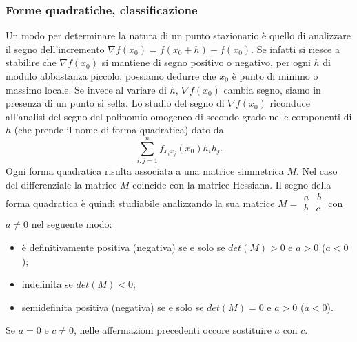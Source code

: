 \subsubsection*{Forme quadratiche, classificazione}
Un modo per determinare la natura di un punto stazionario è quello di analizzare il segno dell'incremento $\nabla f(x_0) = f(x_0 + h ) - f(x_0)$. Se infatti si riesce a stabilire che $\nabla f(x_0)$ si mantiene di segno positivo o negativo, per ogni $h$ di modulo abbastanza piccolo, possiamo dedurre che $x_0$ è punto di minimo o massimo locale. Se invece al variare di $h$, $\nabla f(x_0)$ cambia segno, siamo in presenza di un punto si sella.\newline
Lo studio del segno di $\nabla f(x_0)$ riconduce all'analisi del segno del polinomio omogeneo di secondo grado nelle componenti di $h$ (che prende il nome di forma quadratica) dato da
\[
    \sum_{i,j=1}^{n}f_{x_ix_j}(x_0)h_ih_j.
\]
Ogni forma quadratica risulta associata a una matrice simmetrica $M$. Nel caso del differenziale la matrice $M$ coincide con la matrice Hessiana.\newline
Il segno della forma quadratica è quindi studiabile analizzando la sua matrice $M = \begin{matrix}
    a \;\;\; b\\
    b \;\;\; c\\
\end{matrix}$ con $a\neq 0$ nel seguente modo:
\begin{itemize}
    \item è definitivamente positiva (negativa) se e solo se $det(M)>0$ e $a >0$ ($a<0$);
    \item indefinita se $det(M)<0$;
    \item semidefinita positiva (negativa) se e solo se $det(M)=0$ e $a>0$ ($a<0$).
\end{itemize}
Se $a = 0$ e $c\neq 0$, nelle affermazioni precedenti occore sostituire $a$ con $c$.
